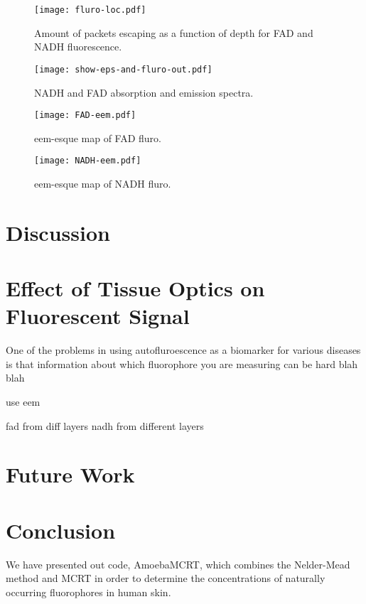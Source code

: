 \begin{figure}[!htpb]
    \centering
    \texttt{[image: fluro-loc.pdf]}
    \caption{Amount of packets escaping as a function of depth for FAD and NADH fluorescence.}
    \label{fig:floc}
\end{figure}

\begin{figure}[!htpb]
    \centering
    \texttt{[image: show-eps-and-fluro-out.pdf]}
    \caption{NADH and FAD absorption and emission spectra.}
    \label{fig:epsfluro}
\end{figure}

\begin{figure}[!htpb]
    \centering
    \texttt{[image: FAD-eem.pdf]}
    \caption{eem-esque map of FAD fluro.}
    \label{fig:fadeem}
\end{figure}

\begin{figure}[!htpb]
    \centering
    \texttt{[image: NADH-eem.pdf]}
    \caption{eem-esque map of NADH fluro.}
    \label{fig:nadheem}
\end{figure}

\section{Discussion}

\section{Effect of Tissue Optics on Fluorescent Signal}

One of the problems in using autofluroescence as a biomarker for various diseases is that information about which fluorophore you are measuring can be hard blah blah

use eem

fad from diff layers
nadh from different layers


\section{Future Work}

\section{Conclusion}

We have presented out code, AmoebaMCRT, which combines the Nelder-Mead method and MCRT in order to determine the concentrations of naturally occurring fluorophores in human skin.



